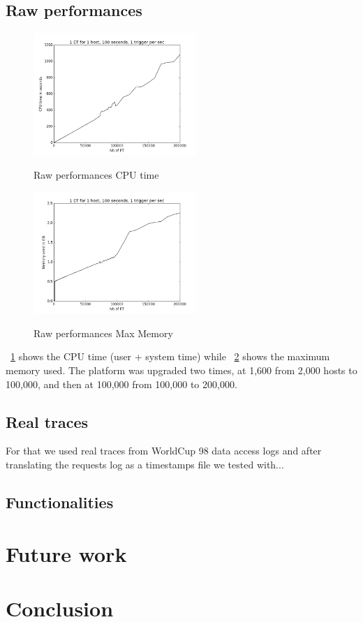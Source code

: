 \documentclass[a4paper]{IEEEtran}
\begin{document}
  \subsection{Raw performances}
    \begin{figure}
      \caption{Raw performances CPU time}
      \centering
      \includegraphics[width=0.55\textwidth]{../plots/raw_perf_time}
      \label{time_raw}
    \end{figure}
    \begin{figure}
      \caption{Raw performances Max Memory}
      \centering
      \includegraphics[width=0.55\textwidth]{../plots/raw_perf_mem}
      \label{mem_raw}
    \end{figure}
    
    \figurename~\ref{time_raw} shows the CPU time (user + system time) while 
    \figurename~\ref{mem_raw} shows the maximum memory used. The platform was
    upgraded two times, at 1,600 from 2,000 hosts to 100,000, and then at
    100,000 from 100,000 to 200,000.
    
    
  \subsection{Real traces}
    For that we used real traces from WorldCup 98 
    data access logs \cite{wc98} and after translating the requests log as a 
    timestamps file we tested with...
  
  \subsection{Functionalities}
  

\section{Future work} \label{futurework}
  

\section{Conclusion} \label{conclu}





\end{document}
